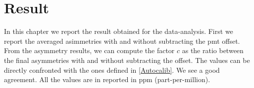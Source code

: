 \chapter{Result} \label{result}


In this chapter we report the result obtained for the data-analysis. First we report the averaged asimmetries with and without subtracting the pmt offset. From the asymmetry results, we can compute the factor $c$ as the ratio between the final asymmetries with and without subtracting the offset. The values can be directly confronted with the ones defined in \ref{Autocalib}. We see a good agreement. All the values are in reported in ppm (part-per-million).

